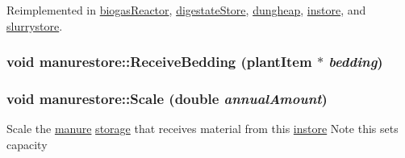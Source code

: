 Reimplemented in \hyperlink{classbiogas_reactor_aafc4e774b0d67a08d3f55c566e5a58b7}{biogasReactor}, \hyperlink{classdigestate_store_a93cdf55c94956f5e817ad386ea0c2a4b}{digestateStore}, \hyperlink{classdungheap_a369749ce14a7061f1c1f4e0c6973d68f}{dungheap}, \hyperlink{classinstore_a5f289ba185023e4b7c15d82e79d1ac7f}{instore}, and \hyperlink{classslurrystore_a20975780b58214d7a091cbc2573c910c}{slurrystore}.\hypertarget{classmanurestore_a990ad099823ec82d8e2afd5a6379420b}{
\subsubsection[{ReceiveBedding}]{\setlength{\rightskip}{0pt plus 5cm}void manurestore::ReceiveBedding ({\bf plantItem} $\ast$ {\em bedding})}}
\label{classmanurestore_a990ad099823ec82d8e2afd5a6379420b}
\hypertarget{classmanurestore_a1efaaee1df384e1eb1705c104d8567c7}{
\subsubsection[{Scale}]{\setlength{\rightskip}{0pt plus 5cm}void manurestore::Scale (double {\em annualAmount})}}
\label{classmanurestore_a1efaaee1df384e1eb1705c104d8567c7}
Scale the \hyperlink{classmanure}{manure} \hyperlink{classstorage}{storage} that receives material from this \hyperlink{classinstore}{instore} Note this sets capacity 

